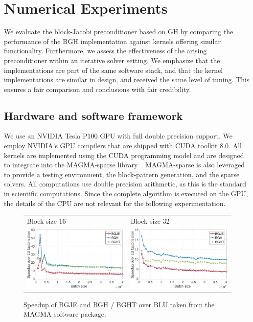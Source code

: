 \section{Numerical Experiments}
We evaluate the block-Jacobi preconditioner based on GH 
by comparing the performance of the BGH implementation 
against kernels offering similar functionality.
Furthermore, we assess the effectiveness of the arising preconditioner within an iterative solver setting.
We emphasize that the implementations are part of the same software stack,
and that the kernel implementations are similar in design, and received the same level of tuning. 
This ensures a fair comparison and conclusions with fair credibility. 


\subsection{Hardware and software framework}
We use an NVIDIA Tesla P100 GPU with full double precision support.
We employ NVIDIA's GPU compilers that are shipped with CUDA toolkit 8.0. 
All kernels are implemented using the CUDA programming model and are designed to integrate into the MAGMA-sparse library~\cite{magma}.
MAGMA-sparse is also leveraged to provide a testing environment, the block-pattern generation, and the sparse solvers.
All computations use double precision arithmetic, as this is the standard in scientific computations.
Since the complete algorithm is executed on the GPU, the details of the CPU are not relevant for the following experimentation. 


\begin{figure}
\begin{center}
\begin{tabular}{ll}
Block size 16 & Block size 32\\
\includegraphics[width=.45\columnwidth]{plots/dgebjp_setup_P100_lu_gje_gh_16_speedup.pdf}
&
\includegraphics[width=.45\columnwidth]{plots/dgebjp_setup_P100_lu_gje_gh_32_speedup.pdf}
\end{tabular}
\end{center}
\caption{
Speedup of BGJE and BGH / BGHT over BLU taken from the MAGMA software package.
}
\label{2017-gh-block-jacobi:fig:bgjeperformance}
\end{figure}

